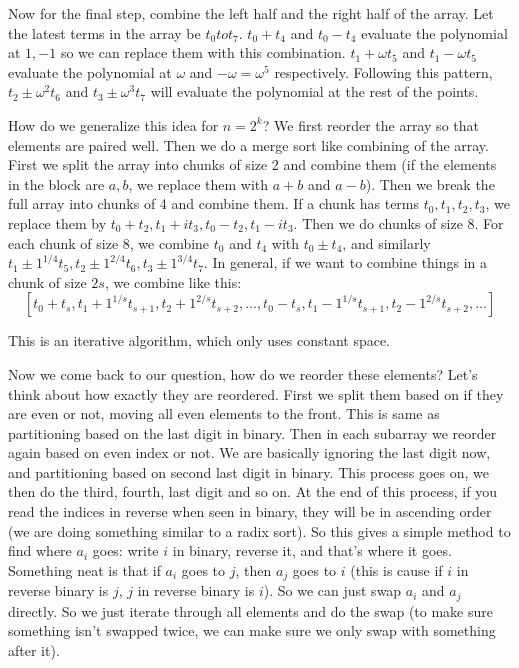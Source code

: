 \documentclass[12pt]{report}
\begin{document}
\begin{enumerate}[label=\textbf{\arabic*.}]
    Now for the final step, combine the left half and the right half of the array. Let the latest terms in the array be $t_0 to t_7$. $t_0 + t_4$ and 
    $t_0 - t_4$ evaluate the polynomial at $1, -1$ so we can replace them with this combination. $t_1 + \omega t_5$ and $t_1 - \omega t_5$ evaluate the 
    polynomial at $\omega$ and $-\omega = \omega^5$ respectively. Following this pattern, $t_2 \pm \omega^2 t_6$ and $t_3 \pm \omega^3 t_7$ will evaluate
    the polynomial at the rest of the points.
    
    How do we generalize this idea for $n = 2^k$? We first reorder the array so that elements are paired well. Then we do a merge sort like combining of the 
    array. First we split the array into chunks of size 2 and combine them (if the elements in the block are $a, b$, we replace them with $a+b$ and $a-b$).
    Then we break the full array into chunks of 4 and combine them. If a chunk has terms $t_0, t_1, t_2, t_3$, we replace them by $t_0 + t_2, t_1 + i t_3, 
    t_0 - t_2, t_1 - i t_3$. Then we do chunks of size 8. For each chunk of size 8, we combine $t_0$ and $t_4$ with $t_0 \pm t_4$, and similarly
    $t_1 \pm 1^{1/4} t_5, t_2 \pm 1^{2/4} t_6, t_3 \pm 1^{3/4} t_7$. In general, if we want to combine things in a chunk of size $2s$, we combine like this: 
    \[ [t_0 + t_{s}, t_1 + 1^{1/s} t_{s+1}, t_2 + 1^{2/s} t_{s+2}, \dots, t_0 - t_{s}, t_1 - 1^{1/s} t_{s+1}, t_2 - 1^{2/s} t_{s+2}, \dots] \]

    This is an iterative algorithm, which only uses constant space.

    Now we come back to our question, how do we reorder these elements? Let's think about how exactly they are reordered. First we split them based on if they 
    are even or not, moving all even elements to the front. This is same as partitioning based on the last digit in binary. Then in each subarray we reorder again
    based on even index or not. We are basically ignoring the last digit now, and partitioning based on second last digit in binary. This process goes on, we then 
    do the third, fourth, last digit and so on. At the end of this process, if you read the indices in reverse when seen in binary, they will be in ascending order 
    (we are doing something similar to a radix sort). So this gives a simple method to find where $a_i$ goes: write $i$ in binary, reverse it, and that's where it 
    goes. Something neat is that if $a_i$ goes to $j$, then $a_j$ goes to $i$ (this is cause if $i$ in reverse binary is $j$, $j$ in reverse binary is $i$). So 
    we can just swap $a_i$ and $a_j$ directly. So we just iterate through all elements and do the swap (to make sure something isn't swapped twice, we can make sure
    we only swap with something after it).


\end{enumerate}
\end{document}
